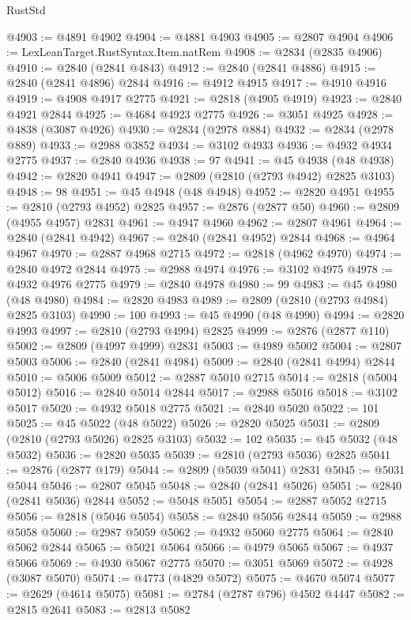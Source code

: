 \begin{lexlean}{RustStd}
\begin{coremodule}
@4903 := @4891 @4902
@4904 := @4881 @4903
@4905 := @2807 @4904
@4906 := LexLeanTarget.RustSyntax.Item.natRem
@4908 := @2834 (@2835 @4906)
@4910 := @2840 (@2841 @4843)
@4912 := @2840 (@2841 @4886)
@4915 := @2840 (@2841 @4896) @2844
@4916 := @4912 @4915
@4917 := @4910 @4916
@4919 := @4908 @4917 @2775
@4921 := @2818 (@4905 @4919)
@4923 := @2840 @4921 @2844
@4925 := @4684 @4923 @2775
@4926 := @3051 @4925
@4928 := @4838 (@3087 @4926)
@4930 := @2834 (@2978 @884)
@4932 := @2834 (@2978 @889)
@4933 := @2988 @3852
@4934 := @3102 @4933
@4936 := @4932 @4934 @2775
@4937 := @2840 @4936
@4938 := 97
@4941 := @45 @4938 (@48 @4938)
@4942 := @2820 @4941
@4947 := @2809 (@2810 (@2793 @4942) @2825 @3103)
@4948 := 98
@4951 := @45 @4948 (@48 @4948)
@4952 := @2820 @4951
@4955 := @2810 (@2793 @4952) @2825
@4957 := @2876 (@2877 @50)
@4960 := @2809 (@4955 @4957) @2831
@4961 := @4947 @4960
@4962 := @2807 @4961
@4964 := @2840 (@2841 @4942)
@4967 := @2840 (@2841 @4952) @2844
@4968 := @4964 @4967
@4970 := @2887 @4968 @2715
@4972 := @2818 (@4962 @4970)
@4974 := @2840 @4972 @2844
@4975 := @2988 @4974
@4976 := @3102 @4975
@4978 := @4932 @4976 @2775
@4979 := @2840 @4978
@4980 := 99
@4983 := @45 @4980 (@48 @4980)
@4984 := @2820 @4983
@4989 := @2809 (@2810 (@2793 @4984) @2825 @3103)
@4990 := 100
@4993 := @45 @4990 (@48 @4990)
@4994 := @2820 @4993
@4997 := @2810 (@2793 @4994) @2825
@4999 := @2876 (@2877 @110)
@5002 := @2809 (@4997 @4999) @2831
@5003 := @4989 @5002
@5004 := @2807 @5003
@5006 := @2840 (@2841 @4984)
@5009 := @2840 (@2841 @4994) @2844
@5010 := @5006 @5009
@5012 := @2887 @5010 @2715
@5014 := @2818 (@5004 @5012)
@5016 := @2840 @5014 @2844
@5017 := @2988 @5016
@5018 := @3102 @5017
@5020 := @4932 @5018 @2775
@5021 := @2840 @5020
@5022 := 101
@5025 := @45 @5022 (@48 @5022)
@5026 := @2820 @5025
@5031 := @2809 (@2810 (@2793 @5026) @2825 @3103)
@5032 := 102
@5035 := @45 @5032 (@48 @5032)
@5036 := @2820 @5035
@5039 := @2810 (@2793 @5036) @2825
@5041 := @2876 (@2877 @179)
@5044 := @2809 (@5039 @5041) @2831
@5045 := @5031 @5044
@5046 := @2807 @5045
@5048 := @2840 (@2841 @5026)
@5051 := @2840 (@2841 @5036) @2844
@5052 := @5048 @5051
@5054 := @2887 @5052 @2715
@5056 := @2818 (@5046 @5054)
@5058 := @2840 @5056 @2844
@5059 := @2988 @5058
@5060 := @2987 @5059
@5062 := @4932 @5060 @2775
@5064 := @2840 @5062 @2844
@5065 := @5021 @5064
@5066 := @4979 @5065
@5067 := @4937 @5066
@5069 := @4930 @5067 @2775
@5070 := @3051 @5069
@5072 := @4928 (@3087 @5070)
@5074 := @4773 (@4829 @5072)
@5075 := @4670 @5074
@5077 := @2629 (@4614 @5075)
@5081 := @2784 (@2787 @796) @4502 @4447
@5082 := @2815 @2641
@5083 := @2813 @5082

\end{coremodule}
\end{lexlean}
